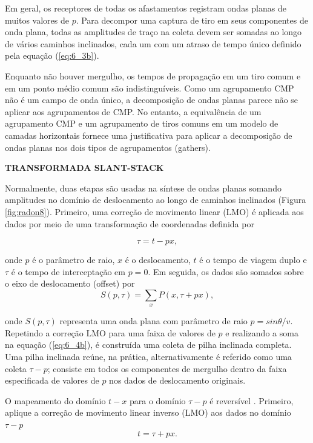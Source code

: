 Em geral, os receptores de todas os afastamentos registram ondas planas de muitos valores de $p$. Para decompor uma captura de tiro em seus componentes de onda plana, todas as amplitudes de traço na coleta devem ser somadas ao longo de vários caminhos inclinados, cada um com um atraso de tempo único definido pela equação (\ref{eq:6_3b}).

Enquanto não houver mergulho, os tempos de propagação em um tiro comum e em um ponto médio comum são indistinguíveis. Como um agrupamento CMP não é um campo de onda único, a decomposição de ondas planas parece não se aplicar aos agrupamentos de CMP. No entanto, a equivalência de um agrupamento CMP e  um agrupamento de tiros comuns em um modelo de camadas horizontais fornece uma justificativa para aplicar a decomposição de ondas planas nos dois tipos de agrupamentos (gathers).


\textbf{TRANSFORMADA SLANT-STACK}


Normalmente, duas etapas são usadas na síntese de ondas planas somando amplitudes no domínio de deslocamento ao longo de caminhos inclinados (Figura \ref{fig:radon8}). Primeiro, uma correção de movimento linear (LMO) é aplicada aos dados por meio de uma transformação de coordenadas definida por \citep{Claerbout(1978)}

\begin{equation}
\tau=t-p x,
\label{eq:6_4a}
\end{equation}

onde $p$ é o parâmetro de raio, $x$ é o deslocamento, $t$ é o tempo de viagem duplo e $\tau$ é o tempo de interceptação em $p = 0$. Em seguida, os dados são somados sobre o eixo de deslocamento (offset) por
\begin{equation}
S(p, \tau)=\sum_{x} P(x, \tau+p x),
\label{eq:6_4b}
\end{equation}

onde $S(p, \tau)$ representa uma onda plana com parâmetro de raio $p = sin\theta/v$. Repetindo a correção LMO para uma faixa de valores de $p$ e realizando a soma na equação (\ref{eq:6_4b}), é construída uma coleta de pilha inclinada completa. Uma pilha inclinada reúne, na prática, alternativamente é referido como uma coleta $\tau - p$; consiste em todos os componentes de mergulho dentro da faixa especificada de valores de $p$ nos dados de deslocamento originais.

O mapeamento do domínio $t - x$ para o domínio $\tau - p$ é reversível \citep{Thorson(1978)}. Primeiro, aplique a correção de movimento linear inverso (LMO) aos dados no domínio $\tau - p$
\begin{equation}
t=\tau+p x.
\label{eq:6_5a}
\end{equation}

